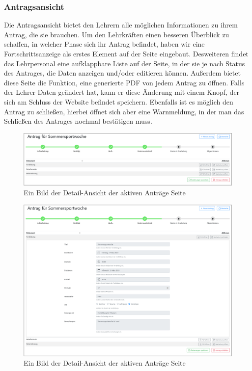 \subsubsection{Antragsansicht}
Die Antragsansicht bietet den Lehrern alle möglichen Informationen zu ihrem Antrag, die sie brauchen. Um den Lehrkräften einen besseren Überblick zu schaffen, in welcher Phase sich ihr Antrag befindet, haben wir eine Fortschrittsanzeige als erstes Element auf der Seite eingebaut. Desweiteren findet das Lehrpersonal eine aufklappbare Liste auf der Seite, in der sie je nach Status des Antrages, die Daten anzeigen und/oder editieren können. Außerdem bietet diese Seite die Funktion, eine generierte PDF von jedem Antrag zu öffnen. Falls der Lehrer Daten geändert hat, kann er diese Änderung mit einem Knopf, der sich am Schluss der Website befindet speichern. Ebenfalls ist es möglich den Antrag zu schließen, hierbei öffnet sich aber eine Warnmeldung, in der man das Schließen des Antrages nochmal bestätigen muss.
\begin{figure}[H]
	\centering
	\includegraphics[width=1\linewidth]{images/website/antrag_zu}
	\caption[Aktiv]{Ein Bild der Detail-Ansicht der aktiven Anträge Seite}
	\label{fig:antragaktivdetail}
\end{figure}
\begin{figure}[H]
	\centering
	\includegraphics[width=1\linewidth]{images/website/antrag}
	\caption[Aktiv]{Ein Bild der Detail-Ansicht der aktiven Anträge Seite}
	\label{fig:antragaktivdetail}
\end{figure}

